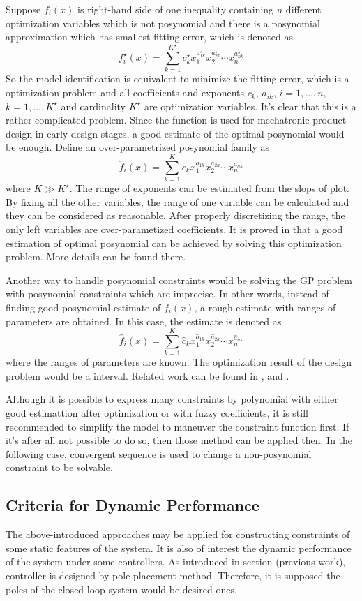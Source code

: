 Suppose $f_i(x)$ is right-hand side of one inequality containing $n$ different optimization variables which is not posynomial and there is a posynomial approximation which has smallest fitting error, which is denoted as $$f_i^\star(x)=\sum_{k=1}^{K^\star} c_k^\star x_1^{{a_{1k}^\star}}x_2^{{a_{2k}^\star}}\cdots x_n^{{a_{nk}^\star}}$$
So the model identification is equivalent to minimize the fitting error, which is a optimization problem and all coefficients and exponents $c_k$, $a_{ik}$, $i=1,\ldots,n$, $k=1,\ldots,K^\star$ and cardinality $K^\star$ are optimization variables. It's clear that this is a rather complicated problem. Since the function is used for mechatronic product design in early design stages, a good estimate of the optimal posynomial would be enough. Define an over-parametrized posynomial family as $$\hat{f}_i(x)=\sum_{k=1}^K c_k x_1^{a_{1k}}x_2^{a_{2k}}\cdots x_n^{a_{nk}}$$ where $K \gg K^\star$. The range of exponents can be estimated from the slops of plot. By fixing all the other variables, the range of one variable can be calculated and they can be considered as reasonable. After properly discretizing the range, the only left variables are over-parametized coefficients. It is proved in \cite{Posynomial2015} that a good estimation of optimal posynomial can be achieved by solving this optimization problem. More details can be found there.

Another way to handle posynomial constraints would be solving the GP problem with posynomial constraints which are imprecise. In other words, instead of finding good posynomial estimate of $f_i(x)$, a rough estimate with ranges of parameters are obtained. In this case, the estimate is denoted as $$\hat{f}_i(x)=\sum_{k=1}^K \hat{c}_{k} x_1^{\hat{a}_{1k}}x_2^{\hat{a}_{2k}}\cdots x_n^{\hat{a}_{nk}}$$ where the ranges of parameters are known. The optimization result of the design problem would be a interval. Related work can be found in \cite{liu2007geometric}, \cite{liu2009using} and \cite{mahapatra2012posynomial}.

Although it is possible to express many constraints by polynomial with either good estimattion after optimization or with fuzzy coefficients, it is still recommended to simplify the model to maneuver the constraint function first. If it's after all not possible to do so, then those method can be applied then. In the following case, convergent sequence is used to change a non-posynomial constraint to be solvable.

\subsection{Criteria for Dynamic Performance}
The above-introduced approaches may be applied for constructing constraints of some static features of the system. It is also of interest the dynamic performance of the system under some controllers. As introduced in section (previous work), controller is designed by pole placement method. Therefore, it is supposed the poles of the closed-loop system would be desired ones. 


